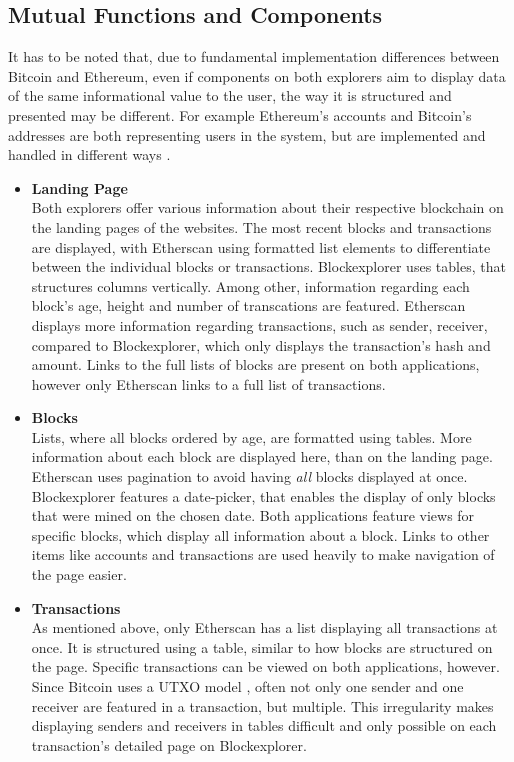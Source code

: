 \subsection{Mutual Functions and Components}
It has to be noted that, due to fundamental implementation differences between Bitcoin and Ethereum, even if components on both explorers aim to display data of the same informational value to the user, the way it is structured and presented may be different. For example Ethereum's accounts and Bitcoin's addresses are both representing users in the system, but are implemented and handled in different ways \cite{ethereum} \cite{bitcoin}.
\begin{itemize}
\item \textbf{Landing Page}\\
Both explorers offer various information about their respective blockchain on the landing pages of the websites. The most recent blocks and transactions are displayed, with Etherscan using formatted list elements to differentiate between the individual blocks or transactions. Blockexplorer uses tables, that structures columns vertically. Among other, information regarding each block's age, height and number of transcations are featured. Etherscan displays more information regarding transactions, such as sender, receiver, compared to Blockexplorer, which only displays the transaction's hash and amount. Links to the full lists of blocks are present on both applications, however only Etherscan links to a full list of transactions.
\item \textbf{Blocks}\\
Lists, where all blocks ordered by age, are formatted using tables. More information about each block are displayed here, than on the landing page. Etherscan uses pagination to avoid having \emph{all} blocks displayed at once. Blockexplorer features a date-picker, that enables the display of only blocks that were mined on the chosen date. Both applications feature views for specific blocks, which display all information about a block. Links to other items like accounts and transactions are used heavily to make navigation of the page easier.
\item \textbf{Transactions}\\
As mentioned above, only Etherscan has a list displaying all transactions at once. It is structured using a table, similar to how blocks are structured on the page. Specific transactions can be viewed on both applications, however. Since Bitcoin uses a UTXO model \cite{bitcoin}, often not only one sender and one receiver are featured in a transaction, but multiple. This irregularity makes displaying senders and receivers in tables difficult and only possible on each transaction's detailed page on Blockexplorer.

\end{itemize}
